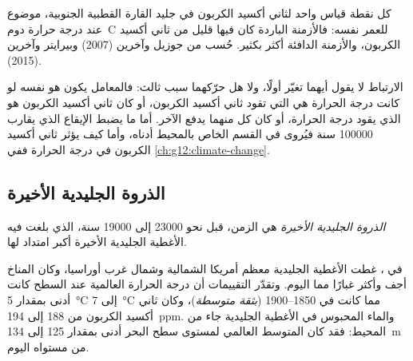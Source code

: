 \begin{omfigure}

{\small كل نقطة قياس واحد لثاني أكسيد الكربون في جليد القارة القطبية الجنوبية،
موضوع عند درجة حرارة دوم~C للعمر نفسه: فالأزمنة الباردة كان فيها قليل من ثاني أكسيد
الكربون، والأزمنة الدافئة أكثر بكثير. حُسب من جوزيل وآخرين (2007)
وبيرايتر وآخرين (2015).}
\end{omfigure}

الارتباط لا يقول أيهما تغيّر أولًا، ولا هل حرّكهما سبب
ثالث: فالمعامل يكون هو نفسه لو كانت درجة الحرارة هي التي تقود ثاني أكسيد
الكربون، أو كان ثاني أكسيد الكربون هو الذي يقود درجة الحرارة، أو كان كل منهما يدفع الآخر.
أما ما يضبط الإيقاع الذي يقارب \num{100000} سنة فيُروى في القسم الخاص
بالمحيط أدناه، وأما كيف يؤثر ثاني أكسيد الكربون في درجة الحرارة ففي
\cref{ch:g12:climate-change}.

\subsection{الذروة الجليدية الأخيرة}

\begin{definition}\label{def:g12:past-climates:lgm}
\emph{الذروة الجليدية الأخيرة} هي الزمن، قبل نحو
\num{23000} إلى \num{19000} سنة، الذي بلغت فيه الأغطية الجليدية 
الأخيرة أكبر امتداد لها.
\end{definition}

في ، غطت الأغطية الجليدية معظم أمريكا الشمالية
وشمال غرب أوراسيا، وكان المناخ أجف وأكثر غبارًا مما اليوم.
وتقدّر التقييمات أن درجة الحرارة العالمية عند السطح كانت أدنى بمقدار \qty{5}{\degreeCelsius}
إلى \qty{7}{\degreeCelsius} مما كانت في 1850--1900 (\emph{بثقة متوسطة})،
وكان ثاني أكسيد الكربون من 188 إلى \qty{194}{ppm}. والماء المحبوس في الأغطية
الجليدية جاء من المحيط: فقد كان المتوسط العالمي لمستوى سطح البحر أدنى بمقدار 125 إلى \qty{134}{m}
من مستواه اليوم.

